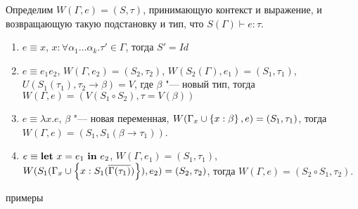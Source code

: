Определим $W(\Gamma, e) = (S, \tau)$, принимающую контекст и выражение, и возвращающую такую подстановку и тип,
что $S(\Gamma) \vdash e : \tau$.
\begin{enumerate}
    \item $e \equiv x$, $x : \forall \alpha_1 \ldots \alpha_k . \tau' \in \Gamma$, тогда $S'=Id$
    \item $e \equiv e_1 e_2$, $W(\Gamma, e_2) = (S_2, \tau_2)$, $W(S_2(\Gamma), e_1) = (S_1, \tau_1)$,
        $U(S_1(\tau_1), \tau_2 \rightarrow \beta) = V$, где $\beta$ "--- новый тип, тогда $W(\Gamma, e)=(V(S_1 \circ S_2),\tau=V(\beta))$
    \item $e\equiv\lambda x . e$, $\beta$ "--- новая переменная, $W(\Gamma_x \cup \left\{x : \beta\right\}, e) = (S_1, \tau_1)$, тогда
        $W(\Gamma, e) = (S_1, S_1(\beta \rightarrow \tau_1))$.
    \item $e\equiv\text{\textbf{let}}~x=e_1~\text{\textbf{in}}~e_2$, $W(\Gamma, e_1) = (S_1, \tau_1)$,
        $W(S_1(\Gamma_x \cup \left\{x : S_1(\overline{\Gamma(\tau_1)})\right\}), e_2) = (S_2, \tau_2)$, тогда
        $W(\Gamma, e) = (S_2 \circ S_1, \tau_2)$.
\end{enumerate}
\todo примеры
